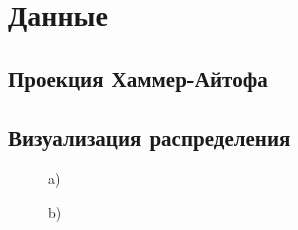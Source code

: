 \documentclass[14pt,aspectratio=43]{beamer}
\begin{document}
\section{Данные}\label{sub:smthzd}
\subsection{Проекция Хаммер-Айтофа}\label{sub:hammer}


\subsection{Визуализация распределения}\label{sub:smthrs}
\begin{frame}[<alignment>]

\begin{figure}[H]
\begin{minipage}[h]{0.47\linewidth}
 a) \\
\end{minipage}
\hfill
\begin{minipage}[h]{0.47\linewidth}
 b) \\

\end{minipage}
\end{figure}
\end{frame}
\end{document}
